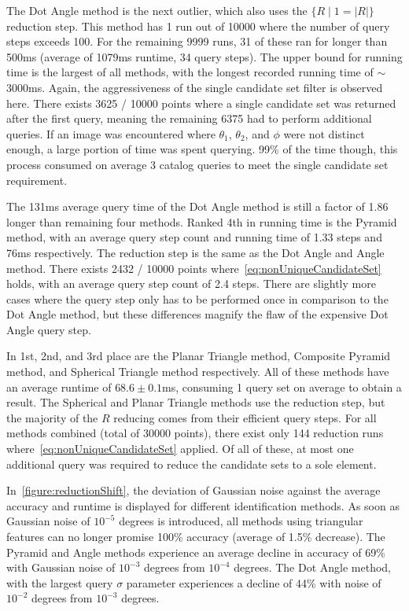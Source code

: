 The Dot Angle method is the next outlier, which also uses the $\{ R \mid 1 = |R| \}$ reduction step.
This method has 1 run out of 10000 where the number of query steps exceeds 100.
For the remaining 9999 runs, 31 of these ran for longer than 500ms (average of 1079ms runtime, 34 query steps).
The upper bound for running time is the largest of all methods, with the longest recorded running time of $\sim$3000ms.
Again, the aggressiveness of the single candidate set filter is observed here.
There exists 3625 / 10000 points where a single candidate set was returned after the first query, meaning the remaining
6375 had to perform additional queries.
If an image was encountered where $\theta_1$, $\theta_2$, and $\phi$ were not distinct enough, a large portion of time
was spent querying.
99\% of the time though, this process consumed on average 3 catalog queries to meet the single candidate set
requirement.

The 131ms average query time of the Dot Angle method is still a factor of 1.86 longer than remaining four methods.
Ranked 4th in running time is the Pyramid method, with an average query step count and running time of 1.33 steps and
76ms respectively.
The reduction step is the same as the Dot Angle and Angle method.
There exists 2432 / 10000 points where~\autoref{eq:nonUniqueCandidateSet} holds, with an average query step count of
2.4 steps.
There are slightly more cases where the query step only has to be performed once in comparison to the Dot Angle method,
but these differences magnify the flaw of the expensive Dot Angle query step.

In 1st, 2nd, and 3rd place are the Planar Triangle method, Composite Pyramid method, and Spherical Triangle method
respectively.
All of these methods have an average runtime of $68.6 \pm 0.1$ms, consuming 1 query set on average to obtain a result.
The Spherical and Planar Triangle methods use the  reduction step, but the majority of the $R$ reducing
comes from their efficient query steps.
For all methods combined (total of 30000 points), there exist only 144 reduction runs
where~\autoref{eq:nonUniqueCandidateSet} applied.
Of all of these, at most one additional query was required to reduce the candidate sets to a sole element.

In~\autoref{figure:reductionShift}, the deviation of Gaussian noise against the average accuracy and runtime is
displayed for different identification methods.
As soon as Gaussian noise of $10^{-5}$ degrees is introduced, all methods using triangular features can no longer
promise 100\% accuracy (average of 1.5\% decrease).
The Pyramid and Angle methods experience an average decline in accuracy of 69\% with Gaussian noise of $10^{-3}$
degrees from $10^{-4}$ degrees.
The Dot Angle method, with the largest query $\sigma$ parameter experiences a decline of 44\% with noise of $10^{-2}$
degrees from $10^{-3}$ degrees.

